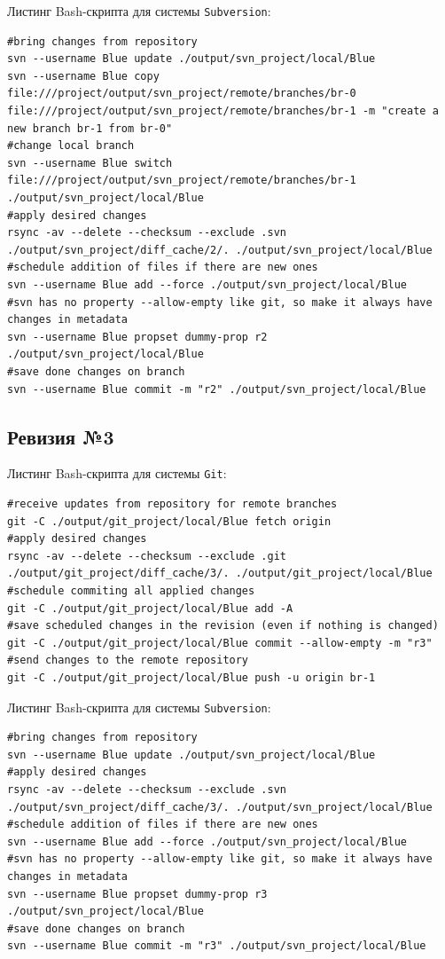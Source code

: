Листинг Bash-скрипта для системы \texttt{Subversion}:
\begin{lstlisting}
#bring changes from repository
svn --username Blue update ./output/svn_project/local/Blue
svn --username Blue copy file:///project/output/svn_project/remote/branches/br-0 file:///project/output/svn_project/remote/branches/br-1 -m "create a new branch br-1 from br-0"
#change local branch
svn --username Blue switch file:///project/output/svn_project/remote/branches/br-1 ./output/svn_project/local/Blue
#apply desired changes
rsync -av --delete --checksum --exclude .svn ./output/svn_project/diff_cache/2/. ./output/svn_project/local/Blue
#schedule addition of files if there are new ones
svn --username Blue add --force ./output/svn_project/local/Blue
#svn has no property --allow-empty like git, so make it always have changes in metadata
svn --username Blue propset dummy-prop r2 ./output/svn_project/local/Blue
#save done changes on branch
svn --username Blue commit -m "r2" ./output/svn_project/local/Blue
\end{lstlisting}


\subsection{Ревизия №3}

Листинг Bash-скрипта для системы \texttt{Git}:
\begin{lstlisting}
#receive updates from repository for remote branches
git -C ./output/git_project/local/Blue fetch origin
#apply desired changes
rsync -av --delete --checksum --exclude .git ./output/git_project/diff_cache/3/. ./output/git_project/local/Blue
#schedule commiting all applied changes
git -C ./output/git_project/local/Blue add -A
#save scheduled changes in the revision (even if nothing is changed)
git -C ./output/git_project/local/Blue commit --allow-empty -m "r3"
#send changes to the remote repository
git -C ./output/git_project/local/Blue push -u origin br-1
\end{lstlisting}

Листинг Bash-скрипта для системы \texttt{Subversion}:
\begin{lstlisting}
#bring changes from repository
svn --username Blue update ./output/svn_project/local/Blue
#apply desired changes
rsync -av --delete --checksum --exclude .svn ./output/svn_project/diff_cache/3/. ./output/svn_project/local/Blue
#schedule addition of files if there are new ones
svn --username Blue add --force ./output/svn_project/local/Blue
#svn has no property --allow-empty like git, so make it always have changes in metadata
svn --username Blue propset dummy-prop r3 ./output/svn_project/local/Blue
#save done changes on branch
svn --username Blue commit -m "r3" ./output/svn_project/local/Blue
\end{lstlisting}


